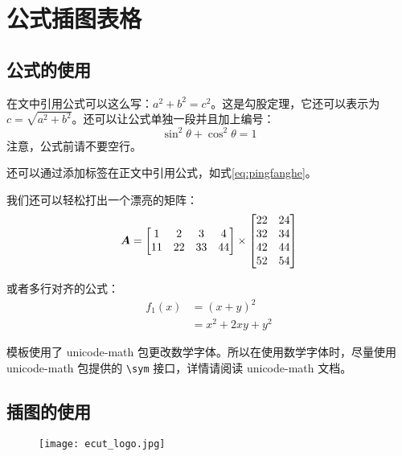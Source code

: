 
\chapter{公式插图表格}
\section{公式的使用}
在文中引用公式可以这么写：\(a^2 + b^2 = c^2\)。这是勾股定理，它还可以表示为 \(c = \sqrt{a^2 + b^2}\)。还可以让公式单独一段并且加上编号：
\begin{equation}
  \sin^2{\theta} + \cos^2{\theta} = 1 \label{eq:pingfanghe}
\end{equation}
注意，公式前请不要空行。

还可以通过添加标签在正文中引用公式，如式\eqref{eq:pingfanghe}。

我们还可以轻松打出一个漂亮的矩阵：
\begin{equation}
  \vb*{A} =
  \begin{bmatrix}
    1  & 2  & 3  & 4  \\
    11 & 22 & 33 & 44 \\
  \end{bmatrix} \times
  \begin{bmatrix}
    22 & 24 \\
    32 & 34 \\
    42 & 44 \\
    52 & 54 \\
  \end{bmatrix}
\end{equation}

或者多行对齐的公式：
\begin{equation}
  \begin{aligned}
    f_1(x) & = (x + y)^2         \\
           & = x^2 + 2 x y + y^2
  \end{aligned}
\end{equation}

模板使用了 unicode-math 包更改数学字体。所以在使用数学字体时，尽量使用 unicode-math 包提供的 \verb|\sym| 接口，详情请阅读 unicode-math 文档。

\section{插图的使用}
\begin{figure}
  \centering
  \texttt{[image: ecut\_logo.jpg]}
  \label{fig:whu}
\end{figure}

